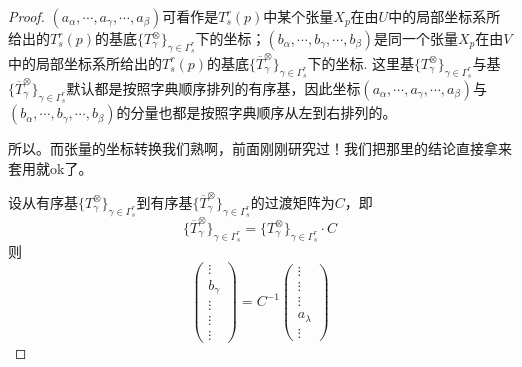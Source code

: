 \begin{proof}
	$(a_{\alpha},\cdots,a_{\gamma},\cdots,a_{\beta})$可看作是$T^{r}_{s}(p)$中某个张量$X_{p}$在由$U$中的局部坐标系所给出的$T^{r}_{s}(p)$的基底$\{T^{\otimes}_{\gamma}\}_{\gamma\in \Gamma^{r}_{s}}$下的坐标；$(b_{\alpha},\cdots,b_{\gamma},\cdots,b_{\beta})$是同一个张量$X_{p}$在由$V$中的局部坐标系所给出的$T^{r}_{s}(p)$的基底$\{\overline{T}^{\otimes}_{\gamma}\}_{\gamma\in \Gamma^{r}_{s}}$下的坐标. 这里基$\{T^{\otimes}_{\gamma}\}_{\gamma\in \Gamma^{r}_{s}}$与基$\{\overline{T}^{\otimes}_{\gamma}\}_{\gamma\in \Gamma^{r}_{s}}$默认都是按照字典顺序排列的有序基，因此坐标$(a_{\alpha},\cdots,a_{\gamma},\cdots,a_{\beta})$与$(b_{\alpha},\cdots,b_{\gamma},\cdots,b_{\beta})$的分量也都是按照字典顺序从左到右排列的。
	
	所以{}。而张量的坐标转换我们熟啊，前面刚刚研究过！我们把那里的结论直接拿来套用就ok了。
	
	设从有序基$\{T^{\otimes}_{\gamma}\}_{\gamma\in \Gamma^{r}_{s}}$到有序基$\{\overline{T}^{\otimes}_{\gamma}\}_{\gamma\in \Gamma^{r}_{s}}$的过渡矩阵为$C$，即
	\[
	\{\overline{T}^{\otimes}_{\gamma}\}_{\gamma\in \Gamma^{r}_{s}}=\{T^{\otimes}_{\gamma}\}_{\gamma\in \Gamma^{r}_{s}}\cdot C
	\]
	则
	\[
	\left( \begin{array}{ccccc}{\vdots} \\ {b_{\gamma}}  \\ {\vdots} \\ {\vdots}\\ {\vdots}\end{array}\right)=C^{-1}\left( \begin{array}{ccccc}{\vdots} \\ {\vdots}  \\ {\vdots} \\ {a_{\lambda}}\\ {\vdots}\end{array}\right)
	\]
	

\end{proof}
